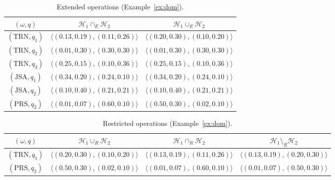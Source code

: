 \begin{table}[htbp]
\caption{Extended operations (Example~\ref{ex:dom}).}\label{tab:domout}
\centering\small
\begin{tabular}{@{}ccc@{}}
\toprule
$(\omega,q)$ & $\mathcal{H}_1\cap_{E}\mathcal{H}_2$ & $\mathcal{H}_1\cup_{E}\mathcal{H}_2$ \\
\midrule
$(\mathrm{TRN},q_{1})$ & $\langle(0.13,0.19),(0.11,0.26)\rangle$ & $\langle(0.20,0.30),(0.10,0.20)\rangle$ \\
$(\mathrm{TRN},q_{2})$ & $\langle(0.01,0.30),(0.30,0.30)\rangle$ & $\langle(0.01,0.30),(0.30,0.30)\rangle$ \\
$(\mathrm{TRN},q_{3})$ & $\langle(0.25,0.15),(0.10,0.36)\rangle$ & $\langle(0.25,0.15),(0.10,0.36)\rangle$ \\
$(\mathrm{JSA},q_{1})$ & $\langle(0.34,0.20),(0.24,0.10)\rangle$ & $\langle(0.34,0.20),(0.24,0.10)\rangle$ \\
$(\mathrm{JSA},q_{2})$ & $\langle(0.10,0.40),(0.21,0.21)\rangle$ & $\langle(0.10,0.40),(0.21,0.21)\rangle$ \\
$(\mathrm{PRS},q_{2})$ & $\langle(0.01,0.07),(0.60,0.10)\rangle$ & $\langle(0.50,0.30),(0.02,0.10)\rangle$ \\
\bottomrule
\end{tabular}
\end{table}

\begin{table}[htbp]
\caption{Restricted operations (Example~\ref{ex:dom}).}\label{tab:domoutR}
\centering\small
\begin{tabular}{@{}cccc@{}}
\toprule
$(\omega,q)$ & $\mathcal{H}_1\cup_{R}\mathcal{H}_2$ & $\mathcal{H}_1\cap_{R}\mathcal{H}_2$ & $\mathcal{H}_1\setminus_{R}\mathcal{H}_2$ \\
\midrule
$(\mathrm{TRN},q_{1})$ & $\langle(0.20,0.30),(0.10,0.20)\rangle$ & $\langle(0.13,0.19),(0.11,0.26)\rangle$ & $\langle(0.13,0.19),(0.20,0.30)\rangle$ \\
$(\mathrm{PRS},q_{2})$ & $\langle(0.50,0.30),(0.02,0.10)\rangle$ & $\langle(0.01,0.07),(0.60,0.10)\rangle$ & $\langle(0.01,0.07),(0.50,0.30)\rangle$ \\
\bottomrule
\end{tabular}
\end{table}
